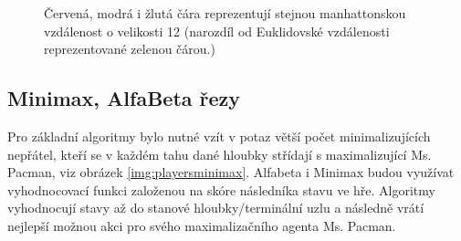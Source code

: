 \begin{figure}[!htbp]
\begin{center}
  \caption{Červená, modrá i žlutá čára reprezentují stejnou manhattonskou vzdálenost o velikosti 12 (narozdíl od Euklidovské vzdálenosti reprezentované zelenou čárou.)}
  \label{img:manhattanDist}
\end{center}
\end{figure}

\subsection{Minimax, AlfaBeta řezy}
\label{navrh:minabmaxy}
Pro základní algoritmy bylo nutné vzít v potaz větší počet minimalizujících nepřátel, kteří se v každém tahu dané hloubky střídají s maximalizující Ms. Pacman, viz obrázek \ref{img:playersminimax}. Alfabeta i Minimax budou využívat vyhodnocovací funkci založenou na skóre následníka stavu ve hře. Algoritmy vyhodnocují stavy až do stanové hloubky/terminální uzlu a následně vrátí nejlepší možnou akci pro svého maximalizačního agenta Ms. Pacman.

